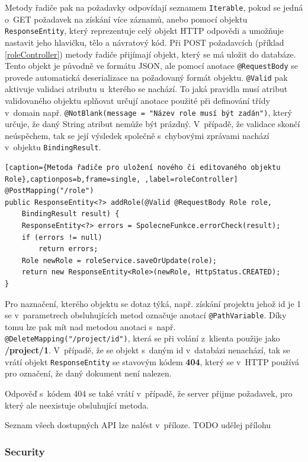  Metody řadiče pak na požadavky odpovídají seznamem \texttt{Iterable}, pokud se jedná o~GET požadavek na získání více záznamů, anebo pomocí objektu \texttt{ResponseEntity}, který reprezentuje celý objekt HTTP odpovědi a umožňuje nastavit jeho hlavičku, tělo a návratový kód. 
Při POST požadavcích (příklad \ref{roleController}) metody řadiče přijímají objekt, který se má uložit do databáze. Tento objekt je původně ve formátu JSON, ale pomocí anotace \texttt{@RequestBody} se provede automatická deserializace na požadovaný formát objektu. \texttt{@Valid} pak aktivuje validaci atributu u~kterého se nachází. To jaká pravidla musí atribut validovaného objektu splňovat určují anotace použité při definování třídy v~domain např. \texttt{@NotBlank(message = "Název role musí být zadán")}, který určuje, že daný String atribut nemůže být prázdný. V~případě, že validace skončí neúspěchem, tak se její výsledek společně s~chybovými zprávami nachází v~objektu \texttt{BindingResult}.

\begin{lstlisting}[caption={Metoda řadiče pro uložení nového či editovaného objektu Role},captionpos=b,frame=single, ,label=roleController]
@PostMapping("/role")
public ResponseEntity<?> addRole(@Valid @RequestBody Role role, 
    BindingResult result) {
    ResponseEntity<?> errors = SpolecneFunkce.errorCheck(result);
    if (errors != null)
        return errors;
    Role newRole = roleService.saveOrUpdate(role);
    return new ResponseEntity<Role>(newRole, HttpStatus.CREATED);
}
\end{lstlisting}

Pro naznačení, kterého objektu se dotaz týká, např. získání projektu jehož id je 1 se v~parametrech obsluhujících metod označuje anotací \texttt{@PathVariable}. Díky tomu lze pak mít nad metodou anotaci s~např. \texttt{@DeleteMapping("/project/{id}")}, která se při volání z~klienta použije jako \textbf{/project/1}. V~případě, že se objekt s~daným id v~databázi nenachází, tak se vrátí objekt \texttt{ResponseEntity} se stavovým kódem \textbf{404}, který se v~HTTP používá pro označení, že daný dokument není nalezen. 

Odpověď s~kódem 404 se také vrátí v~případě, že server přijme požadavek, pro který ale neexistuje obsluhující metoda.

Seznam všech dostupných API lze nalést v~příloze. TODO udělej přílohu

\subsubsection *{Security}

